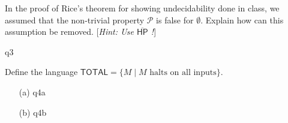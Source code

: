\documentclass[11pt, a4paper,answers]{exam}
\newcommand{\HP}{\mathsf{HP}}
\newcommand{\TOTAL}{\mathsf{TOTAL}}
\begin{document}
\begin{questions}


 In the proof of Rice's theorem for showing undecidability done in class,  we assumed that the non-trivial property $\mathcal{P}$ is false for $\emptyset$.  Explain how can this assumption be removed.  [\textit{Hint: Use $\overline{\HP}$ !}]

\begin{solution}
	{q3}
\end{solution}




 Define the language $\TOTAL = \{M \mid \text{$M$ halts on all inputs} \}$.

\begin{solution}
	\begin{enumerate}
		\item[(a)] {q4a}
		\item[(b)] {q4b}
	\end{enumerate}
\end{solution}

\end{questions}
\end{document}
